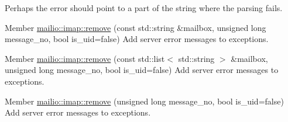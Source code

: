 \begin{DoxyRefList}
%
Perhaps the error should point to a part of the string where the parsing fails. 
\item[Member \mbox{\hyperlink{classmailio_1_1imap_a5aadc54103afb88ac1fa2d36710cb696}{mailio::imap::remove}} (const std\+::string \&mailbox, unsigned long message\+\_\+no, bool is\+\_\+uid=false)]\label{todo__todo000013}%
%
Add server error messages to exceptions. 
\item[Member \mbox{\hyperlink{classmailio_1_1imap_a1bfb542c9957e74214700485ee6badb8}{mailio::imap::remove}} (const std\+::list$<$ std\+::string $>$ \&mailbox, unsigned long message\+\_\+no, bool is\+\_\+uid=false)]\label{todo__todo000014}%
%
Add server error messages to exceptions. 
\item[Member \mbox{\hyperlink{classmailio_1_1imap_a48f71d7ba8627463f89cf4a6153a73fd}{mailio::imap::remove}} (unsigned long message\+\_\+no, bool is\+\_\+uid=false)]\label{todo__todo000015}%
%
Add server error messages to exceptions. 


\end{DoxyRefList}
